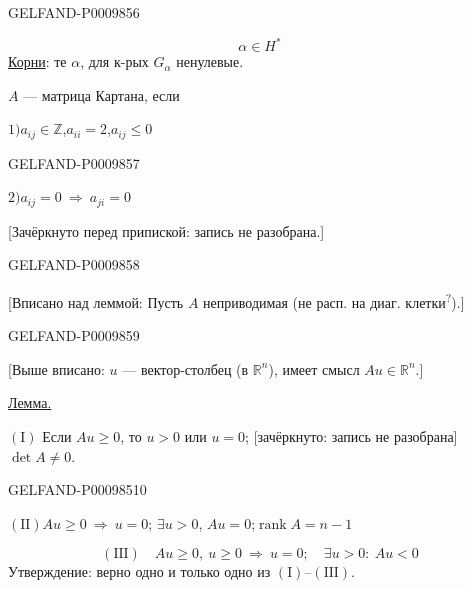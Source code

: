 \begin{GelfandAdjacentEvidence}{GELFAND-P000985}{6}

\[
\alpha\in H^*
\]
\underline{Корни}: те $\alpha$, для к-рых $G_\alpha$ ненулевые.

$A$ --- матрица Картана, если

$1)$\quad $a_{ij}\in\mathbb Z$,\qquad $a_{ii}=2$,\qquad $a_{ij}\le 0$

\end{GelfandAdjacentEvidence}
\begin{GelfandAdjacentEvidence}{GELFAND-P000985}{7}


$2)$\quad $a_{ij}=0\ \Rightarrow\ a_{ji}=0$

[Зачёркнуто перед припиской: запись не разобрана.]
\end{GelfandAdjacentEvidence}
\begin{GelfandAdjacentEvidence}{GELFAND-P000985}{8}


[Вписано над леммой: Пусть $A$ неприводимая (не расп. на диаг. клетки\textsuperscript{?}).]
\end{GelfandAdjacentEvidence}
\begin{GelfandAdjacentEvidence}{GELFAND-P000985}{9}


[Выше вписано: $u$ --- вектор-столбец (в $\mathbb R^n$), имеет смысл $Au\in\mathbb R^n$.]

\underline{Лемма.}

$(\mathrm I)$ Если $Au\ge0$, то $u>0$ или $u=0$; [зачёркнуто: запись не разобрана] $\det A\ne0$.
\end{GelfandAdjacentEvidence}
\begin{GelfandAdjacentEvidence}{GELFAND-P000985}{10}


$(\mathrm{II})$\quad $Au\ge0\ \Rightarrow\ u=0$;
\quad $\exists u>0$, $Au=0$;\quad $\operatorname{rank}A=n-1$

\end{GelfandAdjacentEvidence}

\[
(\mathrm{III})\quad Au\ge0,\ u\ge0\ \Rightarrow\ u=0;
\quad \exists u>0:\ Au<0
\]
Утверждение: верно одно и только одно из $(\mathrm I)$–$(\mathrm{III})$.


